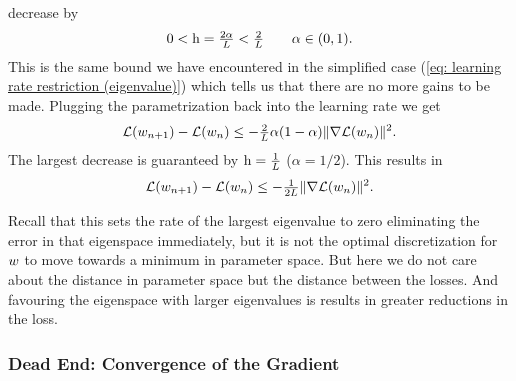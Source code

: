 decrease by
\begin{align}\label{learning rate restrictions}
	0<\text{h}=\tfrac{2\alpha}{L}<\tfrac2{L} \qquad \alpha \in (0,1).
\end{align}
%
This is the same bound we have encountered in the simplified case (\ref{eq:
learning rate restriction (eigenvalue)}) which tells us that there are no more
gains to be made. Plugging the parametrization back into the learning rate we
get
%
\begin{align*}
	\mathcal{L}(w_{n+1}) - \mathcal{L}(w_n)
	\le - \tfrac{2}{L}\alpha (1-\alpha)\|\nabla \mathcal{L}(w_n)\|^2.
\end{align*}
%
The largest decrease is guaranteed by \(\text{h}=\tfrac{1}{L}\) (\(\alpha=1/2\)).
This results in
%
\begin{align}\label{eq: optimal loss decrease step}
	\mathcal{L}(w_{n+1}) - \mathcal{L}(w_n)
	\le - \tfrac{1}{2L}\|\nabla \mathcal{L}(w_n)\|^2.
\end{align}
\begin{remark}
	Recall that this sets the rate of the largest eigenvalue to zero eliminating
	the error in that eigenspace immediately, but it is not the optimal
	discretization for \(w\) to move towards a minimum in parameter space.
	But here we do not care about the distance in parameter space but the
	distance between the losses. And favouring the eigenspace with larger
	eigenvalues is results in greater reductions in the loss.
\end{remark}
%
\subsubsection{Dead End: Convergence of the Gradient}

